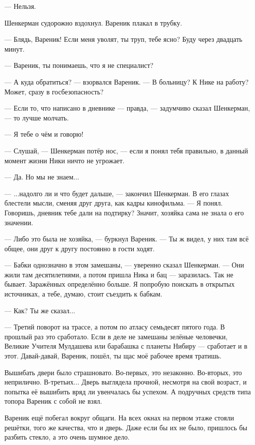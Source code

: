 --- Нельзя.

Шенкерман судорожно вздохнул.
Вареник плакал в трубку.

--- Блядь, Вареник!
Если меня уволят, ты труп, тебе ясно?
Буду через двадцать минут.

\asterism

--- Вареник, ты понимаешь, что я не специалист?

--- А куда обратиться? --- взорвался Вареник.
--- В больницу?
К Нике на работу?
Может, сразу в госбезопасность?

--- Если то, что написано в дневнике --- правда, --- задумчиво сказал Шенкерман, --- то лучше молчать.

--- Я тебе о чём и говорю!

--- Слушай, --- Шенкерман потёр нос, --- если я понял тебя правильно, в данный момент жизни Ники ничто не угрожает.

--- Да.
Но мы не знаем...

--- ...надолго ли и что будет дальше, --- закончил Шенкерман.
В его глазах блестели мысли, сменяя друг друга, как кадры кинофильма.
--- Я понял.
Говоришь, дневник тебе дали на подтирку?
Значит, хозяйка сама не знала о его значении.

--- Либо это была не хозяйка, --- буркнул Вареник.
--- Ты ж видел, у них там всё общее, они друг к другу постоянно в гости ходят.

--- Бабки однозначно в этом замешаны, --- уверенно сказал Шенкерман.
--- Они жили там десятилетиями, а потом пришла Ника и бац --- заразилась.
Так не бывает.
Заражённых определённо больше.
Я попробую поискать в открытых источниках, а тебе, думаю, стоит съездить к бабкам.

--- Как?
Ты же сказал...

--- Третий поворот на трассе, а потом по атласу семьдесят пятого года.
В прошлый раз это сработало.
Если в деле не замешаны зелёные человечки, Великие Учителя Мулдашева или барабашка с планеты Нибиру --- сработает и в этот.
Давай-давай, Вареник, пошёл, ты щас моё рабочее время тратишь.

\asterism

\textspace

Вышибать двери было страшновато.
Во-первых, это незаконно.
Во-вторых, это неприлично.
В-третьих...
Дверь выглядела прочной, несмотря на свой возраст, и попытка её вышибить вряд ли увенчалась бы успехом.
А подручных средств типа топора Вареник с собой не взял.

Вареник ещё побегал вокруг общаги.
На всех окнах на первом этаже стояли решётки, того же качества, что и дверь.
Даже если бы их не было, пришлось бы разбить стекло, а это очень шумное дело.


